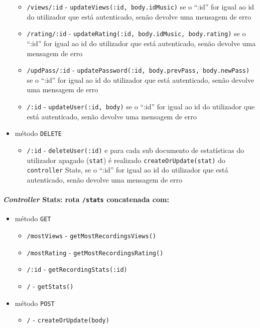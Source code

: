 \documentclass{article}
\begin{document}
\begin{itemize}
\begin{itemize}
                \item \texttt{/views/:id} - \texttt{updateViews(:id, body.idMusic)} se o ``:id'' for igual ao id do utilizador que está autenticado, senão devolve uma mensagem de erro
                \item \texttt{/rating/:id} - \texttt{updateRating(:id, body.idMusic, body.rating)} se o ``:id'' for igual ao id do utilizador que está autenticado, senão devolve uma mensagem de erro
                \item \texttt{/updPass/:id} - \texttt{updatePassword(:id, body.prevPass, body.newPass)} se o ``:id'' for igual ao id do utilizador que está autenticado, senão devolve uma mensagem de erro
                \item \texttt{/:id} - \texttt{updateUser(:id, body)} se o ``:id'' for igual ao id do utilizador que está autenticado, senão devolve uma mensagem de erro
            \end{itemize}
        \item método \texttt{DELETE}
            \begin{itemize}
                \item \texttt{/:id} - \texttt{deleteUser(:id)} e para cada sub documento de estatísticas do utilizador apagado (\texttt{stat}) é realizado \texttt{createOrUpdate(stat)} do \texttt{controller} Stats, se o ``:id'' for igual ao id do utilizador que está autenticado, senão devolve uma mensagem de erro
            \end{itemize}
    \end{itemize}

\paragraph{\textit{Controller} Stats: rota \texttt{/stats} concatenada com:}
    \begin{itemize}
        \item método \texttt{GET}
            \begin{itemize}
                \item \texttt{/mostViews} - \texttt{getMostRecordingsViews()} 
                \item \texttt{/mostRating} - \texttt{getMostRecordingsRating()} 
                \item \texttt{/:id} - \texttt{getRecordingStats(:id)} 
                \item \texttt{/} - \texttt{getStats()} 
            \end{itemize}
        \item método \texttt{POST}
            \begin{itemize}
                \item \texttt{/} - \texttt{createOrUpdate(body)}
            \end{itemize}
    \end{itemize}
\end{document}
